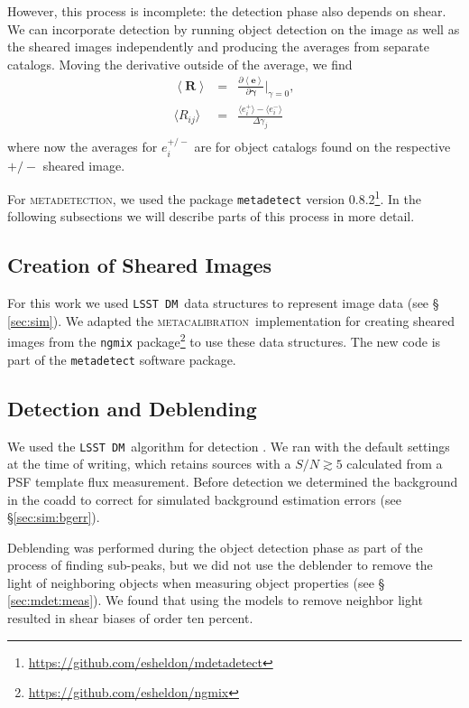 \documentclass[twocolumn,twocolappendix,astrosym]{openjournal}
\newcommand{\dm}{\texttt{LSST DM}}
\newcommand{\mcal}{\textsc{metacalibration}}
\newcommand{\mdet}{\textsc{metadetection}}
\begin{document}
However, this process is incomplete:  the detection phase also depends on
shear.  We can incorporate detection by running object detection on the image
as well as the sheared images independently and producing the averages from
separate catalogs.  Moving the derivative outside of the average, we find
\begin{eqnarray} \label{eq:fullR}
    \left< \boldsymbol{R} \right> &=& \frac{\partial \left< \boldsymbol{e} \right> }{\partial \boldsymbol{\gamma} } \biggr\rvert_{\gamma=0},  \nonumber \\
    \langle R_{ij}\rangle &=& \frac{\langle e_i^{+}\rangle - \langle e_i^{-}\rangle}{\Delta\gamma_j} \nonumber \\
\end{eqnarray}
where now the averages for $e_i^{+/-}$ are for object catalogs found on the
respective ${+/-}$ sheared image.

For \mdet, we used the package \texttt{metadetect} version
0.8.2\footnote{\url{https://github.com/esheldon/mdetadetect}}.  In the following subsections
we will describe parts of this process in more detail.

\subsection{Creation of Sheared Images} \label{sec:mdet:sheared}

For this work we used \dm\ data structures to represent image data (see \S
\ref{sec:sim}).  We adapted the \mcal\ implementation for creating sheared
images from the \texttt{ngmix}
package\footnote{\url{https://github.com/esheldon/ngmix}} to use these data
structures.  The new code is part of the \texttt{metadetect} software package.


\subsection{Detection and Deblending} \label{sec:mdet:detect}

We used the \dm\ algorithm for detection \citep{BoschHSC2017}.  We ran with the
default settings at the time of writing, which retains sources with a $S/N
\gtrsim 5$ calculated from a PSF template flux measurement.  Before detection
we determined the background in the coadd to correct for simulated background
estimation errors (see \S \ref{sec:sim:bgerr}).

Deblending was performed during the object detection phase as part of the
process of finding sub-peaks, but we did not use the deblender to remove the
light of neighboring objects when measuring object properties (see \S
\ref{sec:mdet:meas}).  We found that using the models to remove neighbor light
resulted in shear biases of order ten percent.
\end{document}
